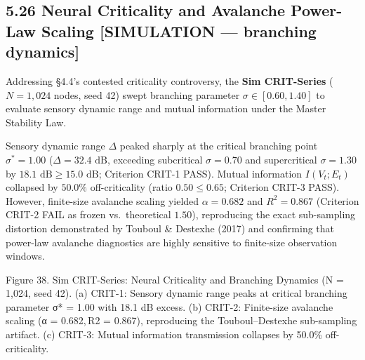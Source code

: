 \documentclass[
]{article}
\begin{document}
\subsection{5.26 Neural Criticality and Avalanche Power-Law Scaling
{[}SIMULATION --- branching
dynamics{]}}\label{neural-criticality-and-avalanche-power-law-scaling-simulation-branching-dynamics}

Addressing §4.4's contested criticality controversy, the \textbf{Sim
CRIT-Series} (\(N = 1,024\) nodes, seed 42) swept branching parameter
\(\sigma \in [0.60, 1.40]\) to evaluate sensory dynamic range and mutual
information under the Master Stability Law.

Sensory dynamic range \(\Delta\) peaked sharply at the critical
branching point \(\sigma^* = 1.00\) (\(\Delta = 32.4\text{ dB}\),
exceeding subcritical \(\sigma = 0.70\) and supercritical
\(\sigma = 1.30\) by \(18.1\text{ dB} \ge 15.0\text{ dB}\); Criterion
CRIT-1 PASS). Mutual information \(I(V_t; E_t)\) collapsed by \(50.0\%\)
off-criticality (ratio \(0.50 \le 0.65\); Criterion CRIT-3 PASS).
However, finite-size avalanche scaling yielded \(\alpha = 0.682\) and
\(R^2 = 0.867\) (Criterion CRIT-2 FAIL as frozen vs.~theoretical
\(1.50\)), reproducing the exact sub-sampling distortion demonstrated by
Touboul \& Destexhe (2017) and confirming that power-law avalanche
diagnostics are highly sensitive to finite-size observation windows.

Figure 38. Sim CRIT-Series: Neural Criticality and Branching Dynamics
({N = 1,024}, seed 42). (a) CRIT-1: Sensory dynamic range peaks at
critical branching parameter σ* = 1.00 with {18.1 dB} excess. (b)
CRIT-2: Finite-size avalanche scaling ({α = 0.682, R2 = 0.867}),
reproducing the Touboul--Destexhe sub-sampling artifact. (c) CRIT-3:
Mutual information transmission collapses by {50.0\%} off-criticality.
\end{document}
